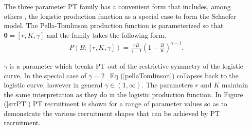 \documentclass[12pt]{article}
\begin{document}
{\color{gray}
The three parameter PT family has a convenient form that includes, among 
others , the 
logistic production function as a special case to form the Schaefer model. The 
Pella-Tomlinson production function is parameterized so that $\bm{\theta} = [r, K, \gamma]$ 
and the family takes the following form, 
\begin{align}
P(B; [r, K, \gamma]) = \frac{r B}{\gamma-1} \left(1-\frac{B}{K}\right)^{\gamma-1}. \label{pellaTomlinson}
\end{align}
%

%
$\gamma$ is a parameter which breaks PT out of the restrictive symmetry of the 
logistic curve. In the special case of $\gamma=2~~$ Eq (\ref{pellaTomlinson}) 
collapses back to the logistic curve, however in general $\gamma\in(1, \infty)$.
The parameters $r$ and $K$ maintain the same interpretation as 
they do in the logistic production function. In Figure (\ref{srrPT}) PT recruitment 
is shown for a range of parameter values so as to demonstrate the various 
recruitment shapes that can be achieved by PT recruitment.  

}
\end{document}
